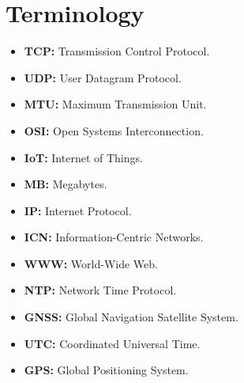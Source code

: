 \documentclass[conference]{IEEEtran}
\begin{document}
    \section{Terminology}
      \begin{itemize}
        \item \textbf{TCP:} Transmission Control Protocol.
        \item \textbf{UDP:} User Datagram Protocol.
        \item \textbf{MTU:} Maximum Transmission Unit.
        \item \textbf{OSI:} Open Systems Interconnection.
        \item \textbf{IoT:} Internet of Things.
        \item \textbf{MB:} Megabytes.
        \item \textbf{IP:} Internet Protocol.
        \item \textbf{ICN:} Information-Centric Networks.
        \item \textbf{WWW:} World-Wide Web.
        \item \textbf{NTP:} Network Time Protocol.
        \item \textbf{GNSS:} Global Navigation Satellite System.
        \item \textbf{UTC:} Coordinated Universal Time.
        \item \textbf{GPS:} Global Positioning System.
      \end{itemize}

  \nocite{*}
	\renewcommand\refname{\section{Reference List}}
	\small{
    }
\end{document}
